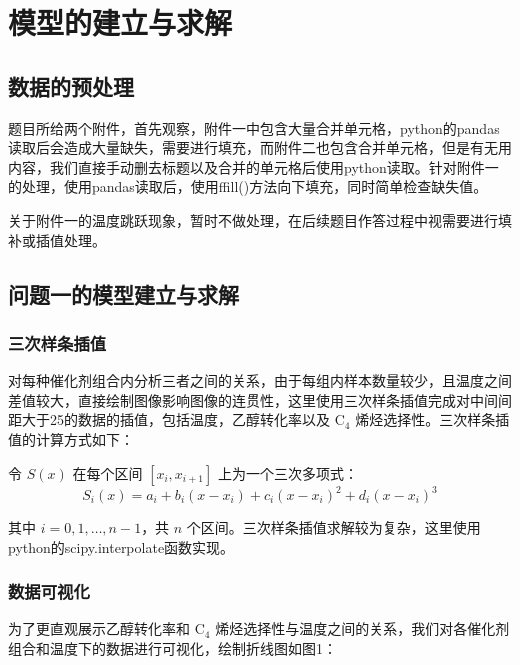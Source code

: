 \newpage	
\section{模型的建立与求解}
\subsection{数据的预处理}

题目所给两个附件，首先观察，附件一中包含大量合并单元格，python的pandas读取后会造成大量缺失，需要进行填充，而附件二也包含合并单元格，但是有无用内容，我们直接手动删去标题以及合并的单元格后使用python读取。针对附件一的处理，使用pandas读取后，使用ffill()方法向下填充，同时简单检查缺失值。

关于附件一的温度跳跃现象，暂时不做处理，在后续题目作答过程中视需要进行填补或插值处理。


\subsection{问题一的模型建立与求解}
\subsubsection{三次样条插值}
对每种催化剂组合内分析三者之间的关系，由于每组内样本数量较少，且温度之间差值较大，直接绘制图像影响图像的连贯性，这里使用三次样条插值完成对中间间距大于25的数据的插值，包括温度，乙醇转化率以及 \( \text{C}_4 \) 烯烃选择性。三次样条插值的计算方式如下：

令 \( S(x) \) 在每个区间 \([x_i, x_{i+1}]\) 上为一个三次多项式：
\[
S_i(x) = a_i + b_i(x - x_i) + c_i(x - x_i)^2 + d_i(x - x_i)^3
\]

其中 \( i = 0, 1, \dots, n-1 \)，共 \( n \) 个区间。三次样条插值求解较为复杂，这里使用python的scipy.interpolate函数实现。

\subsubsection{数据可视化}
为了更直观展示乙醇转化率和 \( \text{C}_4 \) 烯烃选择性与温度之间的关系，我们对各催化剂组合和温度下的数据进行可视化，绘制折线图如图1：

